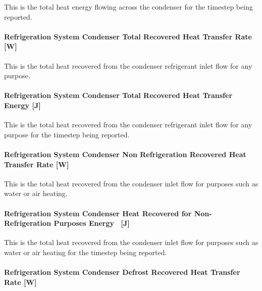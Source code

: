 This is the total heat energy flowing across the condenser for the timestep being reported.

\paragraph{Refrigeration System Condenser Total Recovered Heat Transfer Rate~ {[}W{]}}\label{refrigeration-system-condenser-total-recovered-heat-transfer-rate-w-2}

This is the total heat recovered from the condenser refrigerant inlet flow for any purpose.

\paragraph{Refrigeration System Condenser Total Recovered Heat Transfer Energy {[}J{]}}\label{refrigeration-system-condenser-total-recovered-heat-transfer-energy-j-2}

This is the total heat recovered from the condenser refrigerant inlet flow for any purpose for the timestep being reported.

\paragraph{Refrigeration System Condenser Non Refrigeration Recovered Heat Transfer Rate {[}W{]}}\label{refrigeration-system-condenser-non-refrigeration-recovered-heat-transfer-rate-w-2}

This is the total heat recovered from the condenser inlet flow for purposes such as water or air heating.

\paragraph{Refrigeration System Condenser Heat Recovered for Non-Refrigeration Purposes Energy~ {[}J{]}}\label{refrigeration-system-condenser-heat-recovered-for-non-refrigeration-purposes-energy-j-1}

This is the total heat recovered from the condenser inlet flow for purposes such as water or air heating for the timestep being reported.

\paragraph{Refrigeration System Condenser Defrost Recovered Heat Transfer Rate {[}W{]}}\label{refrigeration-system-condenser-defrost-recovered-heat-transfer-rate-w-2}

